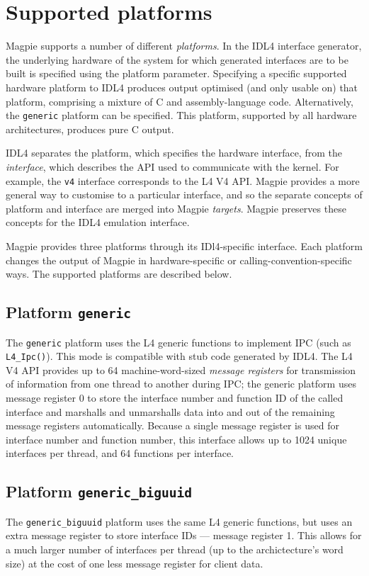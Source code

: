 \section{Supported platforms}
Magpie supports a number of different {\em platforms}. In the IDL4 interface generator, the underlying hardware of the system for which generated interfaces are to be built is specified using the platform parameter. Specifying a specific supported hardware platform to IDL4 produces output optimised (and only usable on) that platform, comprising a mixture of C and assembly-language code. Alternatively, the {\tt generic} platform can be specified. This platform, supported by all hardware architectures, produces pure C output.

IDL4 separates the platform, which specifies the hardware interface, from the {\em interface}, which describes the API used to communicate with the kernel. For example, the {\tt v4} interface corresponds to the L4 V4 API. Magpie provides a more general way to customise to a particular interface, and so the separate concepts of platform and interface are merged into Magpie {\em targets}. Magpie preserves these concepts for the IDL4 emulation interface.

Magpie provides three platforms through its IDl4-specific interface. Each platform changes the output of Magpie in hardware-specific or calling-convention-specific ways. The supported platforms are described below.

\subsection{Platform {\tt generic}}
The {\tt generic} platform uses the L4 generic functions to implement IPC (such as {\tt L4\_Ipc()}). This mode is compatible with stub code generated by IDL4. The L4 V4 API provides up to 64 machine-word-sized {\em message registers} for transmission of information from one thread to another during IPC; the generic platform uses message register 0 to store the interface number and function ID of the called interface and marshalls and unmarshalls data into and out of the remaining message registers automatically. Because a single message register is used for interface number and function number, this interface allows up to 1024 unique interfaces per thread, and 64 functions per interface.

\subsection{Platform {\tt generic\_biguuid}}
The {\tt generic\_biguuid} platform uses the same L4 generic functions, but uses an extra message register to store interface IDs --- message register 1. This allows for a much larger number of interfaces per thread (up to the archictecture's word size) at the cost of one less message register for client data.

